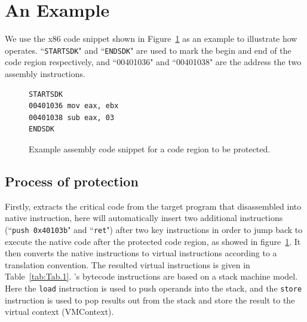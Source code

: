 \section{An Example}\label{sec:case}
We use the x86 code snippet shown in Figure~\ref{fig:examplecode} as an example to illustrate how \DSVMP operates.
``\texttt{STARTSDK}" and ``\texttt{ENDSDK}" are used to mark the begin and end of the code region respectively,
and ``00401036" and ``00401038" are the address the two assembly instructions.

\begin{figure}[t!]
\scriptsize
\begin{lstlisting}
STARTSDK
00401036 mov eax, ebx
00401038 sub eax, 03
ENDSDK
\end{lstlisting}
\caption{Example assembly code snippet for a code region to be protected.}
\label{fig:examplecode}
\end{figure}

\subsection{Process of protection}
Firstly, \DSVMP extracts the critical code from the target program that disassembled into native instruction, here will automatically insert two additional instructions (``\texttt{push 0x40103b}" and ``\texttt{ret}") after two key
instructions in order to jump back to execute the native code
after the protected code region, as showed in figure~\ref{fig:examplecode}.
It then converts the native instructions to virtual instructions according to a translation convention.
The resulted virtual instructions is given in Table~\ref{tab:Tab.1}.
\DSVMP's bytecode instructions are based on a stack machine model.
Here the \texttt{load} instruction is used to push operands into the stack,
and the \texttt{store} instruction is used to pop results out from the stack
and store the result to the virtual context (VMContext).

